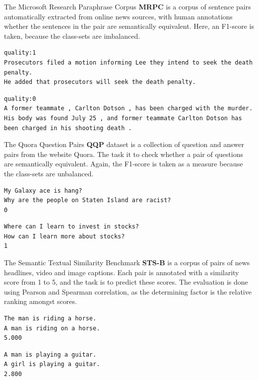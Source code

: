 \documentclass[a4paper,12pt,oneside,openright]{report}
\begin{document}
The Microsoft Research Paraphrase Corpus \textbf{MRPC} \cite{dolan2005} is a corpus of sentence pairs automatically extracted from online news sources, with human annotations whether the sentences in the pair are semantically equivalent.
Here, an F1-score is taken, because the class-sets are imbalanced.


\begin{verbatim}
quality:1	
Prosecutors filed a motion informing Lee they intend to seek the death penalty.	
He added that prosecutors will seek the death penalty.
\end{verbatim}

\begin{verbatim}
quality:0	
A former teammate , Carlton Dotson , has been charged with the murder.	
His body was found July 25 , and former teammate Carlton Dotson has been charged in his shooting death .
\end{verbatim}

The Quora Question Pairs \textbf{QQP} \cite{shankar17} dataset is a collection of question and answer pairs from the website Quora. 
The task it to check whether a pair of questions are semantically equivalent.
Again, the F1-score is taken as a measure because the class-sets are unbalanced.


\begin{verbatim}
My Galaxy ace is hang?	
Why are the people on Staten Island are racist?	
0
\end{verbatim}

\begin{verbatim}
Where can I learn to invest in stocks?	
How can I learn more about stocks?	
1
\end{verbatim}

The Semantic Textual Similarity Benchmark \textbf{STS-B} \cite{cer2017} is a corpus of pairs of news headlines, video and image captions.
Each pair is annotated with a similarity score from 1 to 5, and the task is to predict these scores.
The evaluation is done using Pearson and Spearman correlation, as the determining factor is the relative ranking amongst scores.


\begin{verbatim}
The man is riding a horse.	
A man is riding on a horse.	
5.000
\end{verbatim}

\begin{verbatim}
A man is playing a guitar.
A girl is playing a guitar.	
2.800
\end{verbatim}
\end{document}
